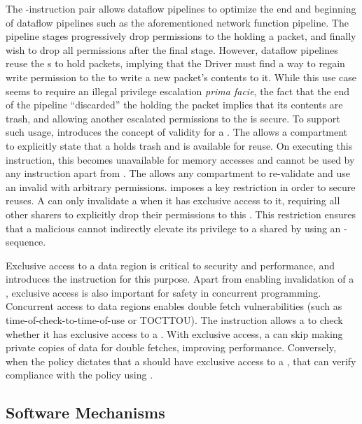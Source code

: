 The \scinval-\screval instruction pair allows dataflow pipelines
to optimize the end and beginning of dataflow pipelines
such as the aforementioned network function pipeline.
The pipeline stages progressively drop permissions to the \cell
holding a packet, and finally wish to drop all permissions after the 
final stage.
However, dataflow pipelines reuse the \cell{}s to hold packets,
implying that the Driver \secdiv must find a way to regain
write permission to the \cell to write a new packet's contents
to it.
While this use case seems to require an illegal privilege escalation 
\textit{prima facie}, the fact that the end of the pipeline ``discarded''
the \cell holding the packet implies that its contents are trash,
and allowing another \secdiv escalated permissions to the \cell
is secure.
To support such usage, \seccells introduces the concept of validity
for a \cell.
The \scinval allows a compartment to explicitly state that a
\cell holds trash and is available for reuse.
On executing this instruction, this \cell becomes unavailable for
memory accesses and cannot be used by any instruction apart from
\screval.
The \screval allows any compartment to re-validate and use an
invalid \cell with arbitrary permissions.
\seccells imposes a key restriction in order to secure \cell reuses.
A \secdiv can only invalidate a \cell when it has exclusive access
to it, requiring all other sharers to explicitly drop their
permissions to this \cell.
This restriction ensures that a malicious \secdiv cannot indirectly elevate its 
privilege to a shared \cell by using an \scinval-\screval sequence.

Exclusive access to a data region is critical to security and
performance, and \seccells introduces the \scexcl instruction for this 
purpose.
Apart from enabling invalidation of a \cell, exclusive access is also
important for safety in concurrent programming.
Concurrent access to data regions enables double fetch vulnerabilities
(such as time-of-check-to-time-of-use or TOCTTOU).
The \scexcl instruction allows a \secdiv to check whether it has
exclusive access to a \cell.
With exclusive access, a \secdiv can skip making private copies
of data for double fetches, improving performance.
Conversely, when the policy dictates that a \secdiv should have
exclusive access to a \cell, that \secdiv can verify compliance with
the policy using \scexcl.

\subsection{Software Mechanisms}
\label{sec:design:softmech}

